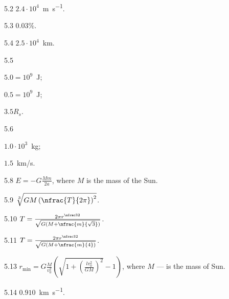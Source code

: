 \protect \section *{\protect {}}
\begin{Solution}{5.{2}}
		$2.4 \cdot 10^4$~\si{\meter\per\second}.
	
\end{Solution}
\begin{Solution}{5.{3}}
		$0.03\%$.
	
\end{Solution}
\begin{Solution}{5.{4}}
		$2.5 \cdot 10^4$~\si{\kilo\meter}.
	
\end{Solution}
\begin{Solution}{5.{5}}
		\begin{enumerate*}[label=(\alph*)]
			\item $5.0 = 10^9$~\si{\joule};
			\item $0.5 = 10^9$~\si{\joule};
			\item $3.5R_s$.
		\end{enumerate*}
	
\end{Solution}
\begin{Solution}{5.{6}}
		\begin{enumerate*}[label=(\alph*)]
			\item $1.0 \cdot 10^3$~kg;
			\item $1.5$~km/s.
		\end{enumerate*}
	
\end{Solution}
\begin{Solution}{5.{8}}
		$E = - G\frac{Mm}{2a}$, where $M$ is the mass of the Sun. 		
	
\end{Solution}
\begin{Solution}{5.{9}}
		$\sqrt[3]{GM\left(\nfrac{T}{2\pi}\right)^2}$.
	
\end{Solution}
\begin{Solution}{5.{10}}
		$T = \frac{2\pi r ^{\nfrac32}}{\sqrt{G(M + \nfrac{m}{\sqrt3})}}$.
	
\end{Solution}
\begin{Solution}{5.{11}}
		$T = \frac{2\pi r ^{\nfrac32}}{\sqrt{G(M + \nfrac{m}{4})}}$.
	
\end{Solution}
\begin{Solution}{5.{13}}
		$r_{\min} = G\frac{M}{v_0^2}\left( \sqrt{1+ \left(\frac{lv_0^2}{GM}\right)^2 } - 1\right) $, where $M$ --- is the mass of Sun.
	
\end{Solution}
\begin{Solution}{5.{14}}
		$0.910$~\si{\kilo\meter\per\second}.
	
\end{Solution}
